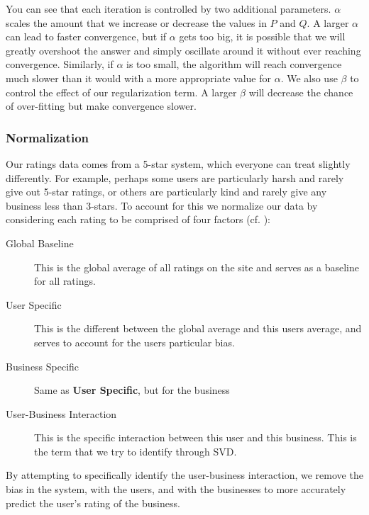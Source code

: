 You can see that each iteration is controlled by two additional parameters.
$\alpha$ scales the amount that we increase or decrease the values in $P$ and
$Q$. A larger $\alpha$ can lead to faster convergence, but if $\alpha$ gets too
big, it is possible that we will greatly overshoot the answer and simply
oscillate around it without ever reaching convergence. Similarly, if $\alpha$
is too small, the algorithm will reach convergence much slower than it would
with a more appropriate value for $\alpha$. We also use $\beta$ to control the
effect of our regularization term.  A larger $\beta$ will decrease the chance
of over-fitting but make convergence slower.

\subsubsection{Normalization}

Our ratings data comes from a 5-star system, which everyone can treat slightly
differently. For example, perhaps some users are particularly harsh and rarely
give out 5-star ratings, or others are particularly kind and rarely give any
business less than 3-stars. To account for this we normalize our data by
considering each rating to be comprised of four factors (cf. \cite{bellkor}): 

\begin{description}

  \item[Global Baseline] This is the global average of all ratings on the site
and serves as a baseline for all ratings.

  \item[User Specific] This is the different between the global average and
this users average, and serves to account for the users particular bias.

  \item[Business Specific] Same as \textbf{User Specific}, but for the business

  \item[User-Business Interaction] This is the specific interaction between this
user and this business. This is the term that we try to identify through SVD. 

\end{description}

By attempting to specifically identify the user-business interaction, we remove
the bias in the system, with the users, and with the businesses to more
accurately predict the user's rating of the business. 

